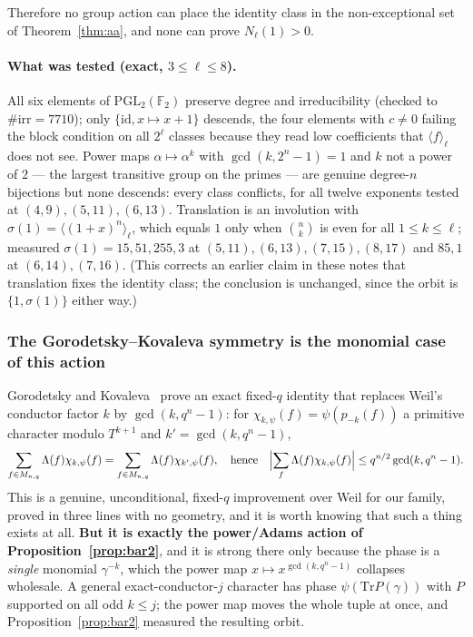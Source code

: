 \documentclass[10pt]{article}
\theoremstyle{plain}
\theoremstyle{definition}
\newcommand{\F}{\mathbb F}
\newcommand{\Lam}{\Lambda}
\newcommand{\Tr}{\mathrm{Tr}}
\begin{document}
Therefore no group action can place the identity class in the non-exceptional
set of Theorem~\ref{thm:aa}, and none can prove $N_\ell(1)>0$.

\paragraph{What was tested (exact, $3\le\ell\le8$).}
All six elements of $\mathrm{PGL}_2(\F_2)$ preserve degree and irreducibility
(checked to $\#\mathrm{irr}=7710$); only $\{\mathrm{id},x\mapsto x+1\}$
descends, the four elements with $c\ne0$ failing the block condition on all
$2^{\ell}$ classes because they read low coefficients that $\langle f\rangle_\ell$
does not see. Power maps $\alpha\mapsto\alpha^k$ with $\gcd(k,2^n-1)=1$ and $k$
not a power of $2$ --- the largest transitive group on the primes --- are genuine
degree-$n$ bijections but none descends: every class conflicts, for all twelve
exponents tested at $(4,9),(5,11),(6,13)$. Translation is an involution with
$\sigma(1)=\langle(1+x)^n\rangle_\ell$, which equals $1$ only when
$\binom{n}{k}$ is even for all $1\le k\le\ell$; measured
$\sigma(1)=15,51,255,3$ at $(5,11),(6,13),(7,15),(8,17)$ and $85,1$ at
$(6,14),(7,16)$. (This corrects an earlier claim in these notes that
translation fixes the identity class; the conclusion is unchanged, since the
orbit is $\{1,\sigma(1)\}$ either way.)

\subsubsection*{The Gorodetsky--Kovaleva symmetry is the monomial case of this
action}

Gorodetsky and Kovaleva~\cite{GK} prove an exact fixed-$q$ identity that
replaces Weil's conductor factor $k$ by $\gcd(k,q^n-1)$: for
$\chi_{k,\psi}(f)=\psi(p_{-k}(f))$ a primitive character modulo $T^{k+1}$ and
$k'=\gcd(k,q^n-1)$,
\[
 \sum_{f\in M_{n,q}}\Lam(f)\chi_{k,\psi}(f)=\sum_{f\in M_{n,q}}\Lam(f)\chi_{k',\psi}(f),
 \quad\text{hence}\quad
 \Bigl|\sum_f\Lam(f)\chi_{k,\psi}(f)\Bigr|\le q^{n/2}\gcd(k,q^n-1).
\]
This is a genuine, unconditional, fixed-$q$ improvement over Weil for our
family, proved in three lines with no geometry, and it is worth knowing that
such a thing exists at all. \textbf{But it is exactly the power/Adams action of
Proposition~\ref{prop:bar2}}, and it is strong there only because the phase is a
\emph{single} monomial $\gamma^{-k}$, which the power map
$x\mapsto x^{\gcd(k,q^n-1)}$ collapses wholesale. A general exact-conductor-$j$
character has phase $\psi(\Tr P(\gamma))$ with $P$ supported on all odd
$k\le j$; the power map moves the whole tuple at once, and
Proposition~\ref{prop:bar2} measured the resulting orbit.
\end{document}
